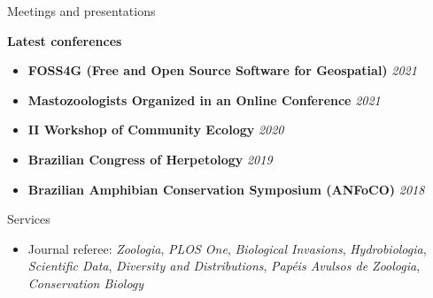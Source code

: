 \documentclass{resume}
\begin{document}
\begin{rSection}{Meetings and presentations}

{\bf Latest conferences}
\begin{itemize}
\item {\bf FOSS4G (Free and Open Source Software for Geospatial)} \hfill{\em 2021}
\item {\bf Mastozoologists Organized in an Online Conference} \hfill{\em 2021}
\item {\bf II Workshop of Community Ecology} \hfill{\em 2020}
\item {\bf Brazilian Congress of Herpetology} \hfill{\em 2019}
\item {\bf Brazilian Amphibian Conservation Symposium (ANFoCO)} \hfill{\em 2018}
\end{itemize}

\end{rSection}


\begin{rSection}{Services}
\begin{itemize}
\item Journal referee: {\it Zoologia}, {\it PLOS One}, {\it Biological Invasions}, {\it Hydrobiologia}, {\it Scientific Data}, {\it Diversity and Distributions}, {\it Papéis Avulsos de Zoologia}, {\it Conservation Biology}
\end{itemize}
\end{rSection}

\end{document}
